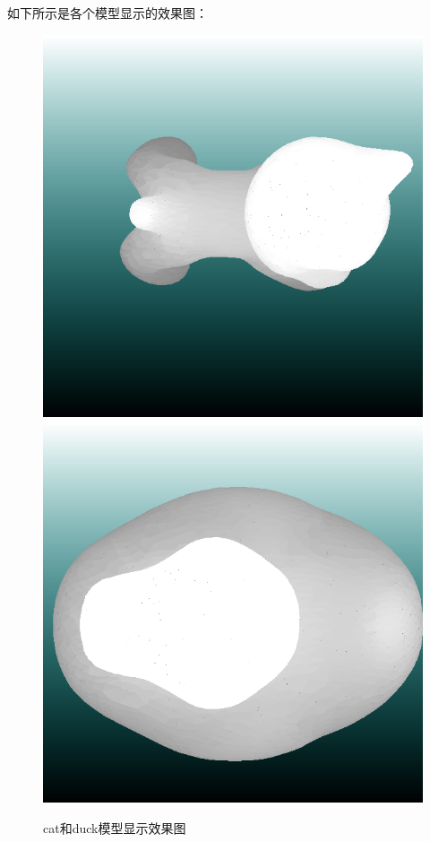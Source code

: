 \documentclass[10pt]{article}
\begin{document}
如下所示是各个模型显示的效果图：
\begin{figure}[H]
\begin{center}
\includegraphics[scale=0.5]{cat.png}
\includegraphics[scale=0.5]{duck.png}
\end{center}
\caption{cat和duck模型显示效果图}
\end{figure}
\end{document}
